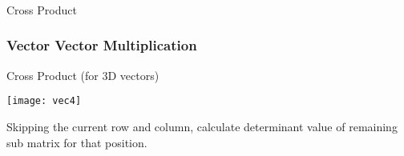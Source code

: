 




 \begin{frame}[fragile]\frametitle{}
\begin{center}
{\Large Cross Product}
\end{center}
\end{frame}


 \begin{frame}[fragile] \frametitle{Vector Vector Multiplication}
Cross Product (for 3D vectors)
\begin{center}
\texttt{[image: vec4]}
\end{center}
Skipping the current row and column, calculate determinant value of remaining sub matrix for that position.
\end{frame}


